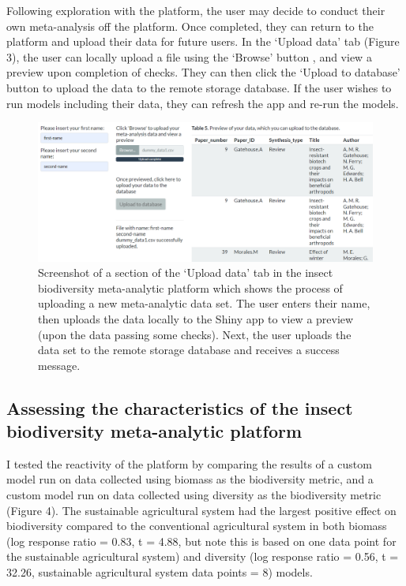 \documentclass[11pt]{article}
\begin{document}
		\noindent Following exploration with the platform, the user may decide to conduct their own meta-analysis off the platform. Once completed, they can return to the platform and upload their data for future users. In the ‘Upload data’ tab (Figure 3), the user can locally upload a file using the ‘Browse’ button , and view a preview upon completion of checks. They can then click the ‘Upload to database’ button to upload the data to the remote storage database. If the user wishes to run models including their data, they can refresh the app and re-run the models.
		
		\begin{figure}[H] 
			\centering 
			\includegraphics[scale=0.55]{figure_3_upload_data_screenshot.png} 
			\caption{Screenshot of a section of the ‘Upload data’ tab in the insect biodiversity meta-analytic platform which shows the process of uploading a new meta-analytic data set. The user enters their name, then uploads the data locally to the Shiny app to view a preview (upon the data passing some checks). Next, the user uploads the data set to the remote storage database and receives a success message.}  
		\end{figure}
		
		\subsection{Assessing the characteristics of the insect biodiversity meta-analytic platform}
		I tested the reactivity of the platform by comparing the results of a custom model run on data collected using biomass as the biodiversity metric, and a custom model run on data collected using diversity as the biodiversity metric (Figure 4). The sustainable agricultural system had the largest positive effect on biodiversity compared to the conventional agricultural system in both biomass (log response ratio = 0.83, t = 4.88, but note this is based on one data point for the sustainable agricultural system) and diversity (log response ratio = 0.56, t = 32.26, sustainable agricultural system data points = 8) models.
		
\end{document}
